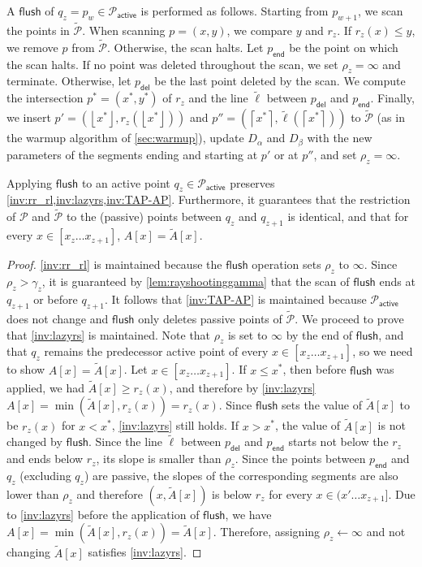 \documentclass[a4paper,UKenglish,cleveref, autoref, thm-restate]{lipics-v2021}
\newcommand{\assign}{\leftarrow}
\renewcommand{\P}{\mathcal{P}}
\newcommand{\AP}{\P_{\mathsf{active}}}
\newcommand{\TA}{\tilde{A}}
\newcommand{\tell}{\tilde{\ell}}
\newcommand{\TP}{\tilde{\P}}
\newcommand{\ray}{r}
\newcommand{\rl}[1]{\rho_{#1}}
\newcommand{\flush}{\mathsf{flush}}
\newcommand{\ceil}[1]{\left\lceil{#1}\right\rceil}
\newcommand{\floor}[1]{\left\lfloor{#1}\right\rfloor}
\begin{document}
A $\flush$ of $q_z = p_w \in \AP$ is performed as follows.
Starting from $p_{w+1}$, we scan the points in $\TP$.
When scanning $p=(x,y)$, we compare $y$ and $\ray_z$. 
If $\ray_z(x) \le y$, we remove $p$ from $\TP$.
Otherwise, the scan halts. 
Let $p_{\mathsf{end}}$ be the point on which the scan halts.
If no point was deleted throughout the scan, we set $\rl{z} = \infty$ and terminate.
Otherwise, let $p_{\mathsf{del}}$ be the last point deleted by the scan.
We compute the intersection $p^*=(x^*,y^*)$ of $\ray_z$ and the line $\tell$ between $p_{\mathsf{del}}$ and $p_{\mathsf{end}}$.
Finally, we insert $p'=(\floor{x^*}, \ray_z(\floor{x^*}))$ and $p''= (\ceil{x^*}, \tell(\ceil{x^*}))$ to $\TP$ (as in the warmup algorithm of \cref{sec:warmup}), update $D_\alpha$ and $D_\beta$ with the new parameters of the segments ending and starting at $p'$ or at $p''$, and set $\rl{z} = \infty$.

\begin{lemma}\label{lem:flush}
Applying $\flush$ to an active point $q_z \in \AP$ preserves \cref{inv:rr_rl,inv:lazyrs,inv:TAP-AP}.
Furthermore, it guarantees that 
the restriction of $\P$ and $\TP$ to the (passive) points between $q_z$ and $q_{z+1}$
is identical,
and that for every $x\in[x_z \ldots x_{z+1}]$, $A[x]=\TA[x]$.
\end{lemma}
\begin{proof}
\cref{inv:rr_rl} is maintained because the $\flush$ operation sets $\rl{z}$ to $\infty$.
Since $\rl{z} > \gamma_{z}$, it is guaranteed by \cref{lem:rayshootinggamma}  that the scan of $\flush$ ends at $q_{z+1}$ or before $q_{z+1}$.
It follows that \cref{inv:TAP-AP} is maintained because $\AP$ does not change and $\flush$ only deletes passive points of $\TP$.
We proceed to prove that \cref{inv:lazyrs} is maintained.
Note that $\rl{z}$ is set to $\infty$ by the end of $\flush$, and that $q_z$ remains the predecessor active point of every $x\in [x_z \ldots x_{z+1}]$, so we need to show $A[x] = \TA[x]$.
Let $x \in [x_z \ldots x_{z+1}]$.
If $x \le x^*$, then before $\flush$ was applied, we had $\TA[x] \ge \ray_{z}(x)$, and therefore by \cref{inv:lazyrs} $A[x] = \min(\TA[x] , \ray_{z}(x)) = \ray_{z}(x)$. Since $\flush$ sets the value of $\TA[x]$ to be $\ray_z(x)$ for $x<x^*$, \cref{inv:lazyrs} still holds.
If $x > x^*$, the value of $\TA[x]$ is not changed by $\flush$.
Since the line $\tell$ between $p_{\mathsf{del}}$ and $p_{\mathsf{end}}$ starts not below the $\ray_{z}$ and ends below $\ray_{z}$, its slope is smaller than $\rl{z}$.
Since the points between $p_{\mathsf{end}}$ and $q_z$ (excluding $q_z$) are passive, the slopes of the corresponding segments are also lower than $\rl{z}$ and therefore $(x,\TA[x])$ is below $\ray_{z}$ for every $x \in (x' \ldots x_{z+1}]$.
Due to \cref{inv:lazyrs} before the application of $\flush$, we have $A[x] = \min(\TA[x], \ray_{z}(x)) = \TA[x]$.
Therefore, assigning $\rl{z} \assign \infty$ and not changing $\TA[x]$ satisfies \cref{inv:lazyrs}.
\end{proof}
\end{document}
